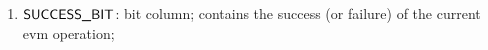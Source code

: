 \begin{enumerate}[resume]
	\item $\textsf{SUCCESS\_BIT}{}$: bit column; contains the success (or failure) of the current evm operation;
\end{enumerate}

